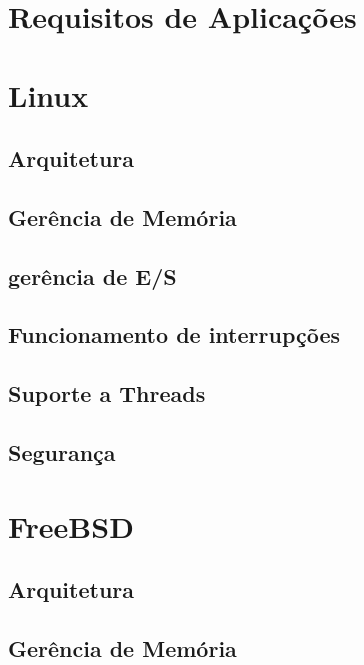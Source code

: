 \documentclass[conference]{IEEEtran}
\begin{document}
\section{Requisitos de Aplicações}\label{sec:req}

\section{Linux}\label{sec:linux}

\subsection{Arquitetura}\label{sec:LinuxArq}

\subsection{Gerência de Memória}\label{sec:LinuxMem}

\subsection{gerência de E/S}\label{sec:LinuxES}

\subsection{Funcionamento de interrupções}\label{sec:LinuxInt}

\subsection{Suporte a Threads}\label{sec:TinuxThreads}

\subsection{Segurança}\label{sec:LinuxSec}

\section{FreeBSD}\label{sec:BSD}

\subsection{Arquitetura}\label{sec:BSDArq}

\subsection{Gerência de Memória}\label{sec:BSDMem}
\end{document}
